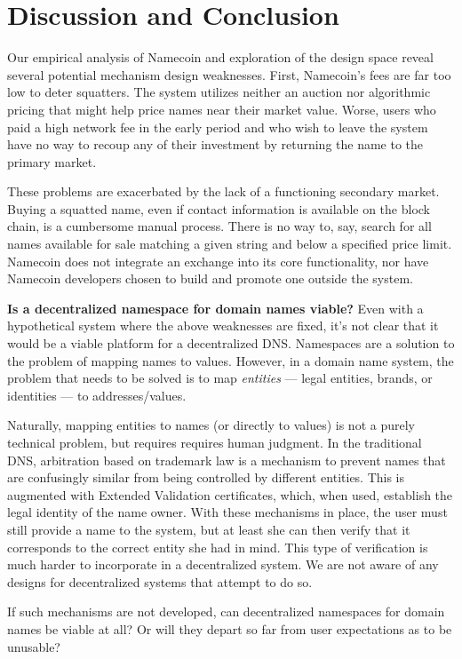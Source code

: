 \section{Discussion and Conclusion}
\label{sec:conclusion}

Our empirical analysis of Namecoin and exploration of the design space reveal several potential mechanism design weaknesses. First, Namecoin's fees are far too low to deter squatters. The system utilizes neither an auction nor algorithmic pricing that might help price names near their market value. Worse, users who paid a high network fee in the early period and who wish to leave the system have no way to recoup any of their investment by returning the name to the primary market.

These problems are exacerbated by the lack of a functioning secondary market. Buying a squatted name, even if contact information is available on the block chain, is a cumbersome manual process. There is no way to, say, search for all names available for sale matching a given string and below a specified price limit. Namecoin does not integrate an exchange into its core functionality, nor have Namecoin developers chosen to build and promote one outside the system.

{\bf Is a decentralized namespace for domain names viable?} Even with a hypothetical system where the above weaknesses are fixed, it's not clear that it would be a viable platform for a decentralized DNS. Namespaces are a solution to the problem of mapping names to values. However, in a domain name system, the problem that needs to be solved is to map {\em entities} --- legal entities, brands, or identities --- to addresses/values.

Naturally, mapping entities to names (or directly to values) is not a purely technical problem, but requires requires human judgment.
In the traditional DNS, arbitration based on trademark law is a mechanism to prevent names that are confusingly similar from being controlled by different entities. This is augmented with Extended Validation certificates, which, when used, establish the legal identity of the name owner. With these mechanisms in place, the user must still provide a name to the system, but at least she can then verify that it corresponds to the correct entity she had in mind. This type of verification is much harder to incorporate in a decentralized system. We are not aware of any designs for decentralized systems that attempt to do so.

If such mechanisms are not developed, can decentralized namespaces for domain names be viable at all? Or will they depart so far from user expectations as to be unusable?

